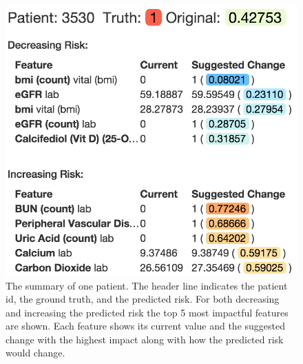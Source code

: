 \begin{figure}[t]
\centering
\includegraphics[width=0.5\linewidth]{prospector/patient_summary} %
\caption{
The summary of one patient. The header line indicates the patient id, the ground truth, and the predicted
risk.
For both decreasing and increasing the predicted risk the top 5 most impactful features are shown.
Each feature shows its current value and the suggested change with the highest impact along with how the predicted risk would change.
}
\label{figs:summary}
\end{figure}